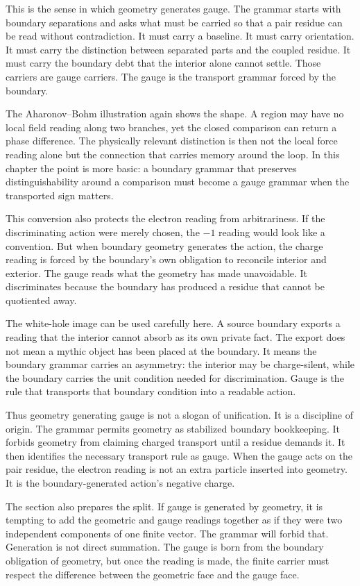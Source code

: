 This is the sense in which geometry generates gauge. The grammar starts with
boundary separations and asks what must be carried so that a pair residue can
be read without contradiction. It must carry a baseline. It must carry
orientation. It must carry the distinction between separated parts and the
coupled residue. It must carry the boundary debt that the interior alone
cannot settle. Those carriers are gauge carriers. The gauge is the transport
grammar forced by the boundary.

The Aharonov--Bohm illustration again shows the shape. A region may have no
local field reading along two branches, yet the closed comparison can return
a phase difference. The physically relevant distinction is then not the
local force reading alone but the connection that carries memory around the
loop. In this chapter the point is more basic: a boundary grammar that
preserves distinguishability around a comparison must become a gauge grammar
when the transported sign matters.

This conversion also protects the electron reading from arbitrariness. If
the discriminating action were merely chosen, the \(-1\) reading would look
like a convention. But when boundary geometry generates the action, the
charge reading is forced by the boundary's own obligation to reconcile
interior and exterior. The gauge reads what the geometry has made
unavoidable. It discriminates because the boundary has produced a residue
that cannot be quotiented away.

The white-hole image can be used carefully here. A source boundary exports a
reading that the interior cannot absorb as its own private fact. The export
does not mean a mythic object has been placed at the boundary. It means the
boundary grammar carries an asymmetry: the interior may be charge-silent,
while the boundary carries the unit condition needed for discrimination.
Gauge is the rule that transports that boundary condition into a readable
action.

Thus geometry generating gauge is not a slogan of unification. It is a
discipline of origin. The grammar permits geometry as stabilized boundary
bookkeeping. It forbids geometry from claiming charged transport until a
residue demands it. It then identifies the necessary transport rule as gauge.
When the gauge acts on the pair residue, the electron reading is not an
extra particle inserted into geometry. It is the boundary-generated action's
negative charge.

The section also prepares the split. If gauge is generated by geometry, it
is tempting to add the geometric and gauge readings together as if they were
two independent components of one finite vector. The grammar will forbid
that. Generation is not direct summation. The gauge is born from the boundary
obligation of geometry, but once the reading is made, the finite carrier must
respect the difference between the geometric face and the gauge face.

